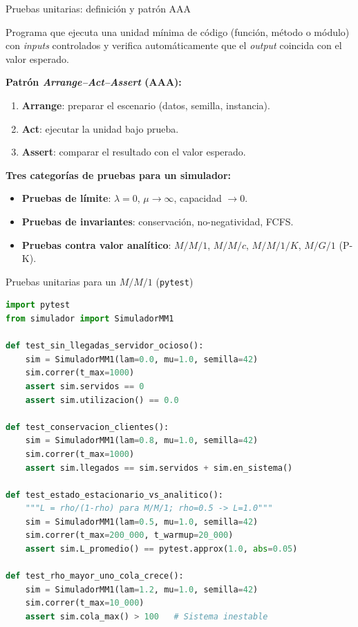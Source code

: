 \documentclass[aspectratio=1610, 10pt]{beamer}
\begin{document}
\begin{frame}{Pruebas unitarias: definición y patrón AAA}
  \begin{definicionbox}
    \footnotesize
    Programa que ejecuta una unidad mínima de código (función, método o módulo)
    con \emph{inputs} controlados y verifica automáticamente que el \emph{output}
    coincida con el valor esperado.
  \end{definicionbox}

  \vspace{4pt}
  \footnotesize
  \textbf{Patrón \emph{Arrange–Act–Assert} (AAA):}
  \begin{enumerate}\itemsep1pt
    \item \textbf{Arrange}: preparar el escenario (datos, semilla, instancia).
    \item \textbf{Act}: ejecutar la unidad bajo prueba.
    \item \textbf{Assert}: comparar el resultado con el valor esperado.
  \end{enumerate}

  \vspace{4pt}
  \textbf{Tres categorías de pruebas para un simulador:}
  \begin{itemize}\itemsep1pt
    \item \textbf{Pruebas de límite}: $\lambda=0$, $\mu\to\infty$, capacidad $\to 0$.
    \item \textbf{Pruebas de invariantes}: conservación, no-negatividad, FCFS.
    \item \textbf{Pruebas contra valor analítico}: $M/M/1$, $M/M/c$, $M/M/1/K$, $M/G/1$ (P-K).
  \end{itemize}
\end{frame}

\begin{frame}[fragile]{Pruebas unitarias para un $M/M/1$ (\texttt{pytest})}
\begin{lstlisting}[language=Python]
import pytest
from simulador import SimuladorMM1

def test_sin_llegadas_servidor_ocioso():
    sim = SimuladorMM1(lam=0.0, mu=1.0, semilla=42)
    sim.correr(t_max=1000)
    assert sim.servidos == 0
    assert sim.utilizacion() == 0.0

def test_conservacion_clientes():
    sim = SimuladorMM1(lam=0.8, mu=1.0, semilla=42)
    sim.correr(t_max=1000)
    assert sim.llegados == sim.servidos + sim.en_sistema()

def test_estado_estacionario_vs_analitico():
    """L = rho/(1-rho) para M/M/1; rho=0.5 -> L=1.0"""
    sim = SimuladorMM1(lam=0.5, mu=1.0, semilla=42)
    sim.correr(t_max=200_000, t_warmup=20_000)
    assert sim.L_promedio() == pytest.approx(1.0, abs=0.05)

def test_rho_mayor_uno_cola_crece():
    sim = SimuladorMM1(lam=1.2, mu=1.0, semilla=42)
    sim.correr(t_max=10_000)
    assert sim.cola_max() > 100   # Sistema inestable
\end{lstlisting}
\end{frame}
\end{document}
